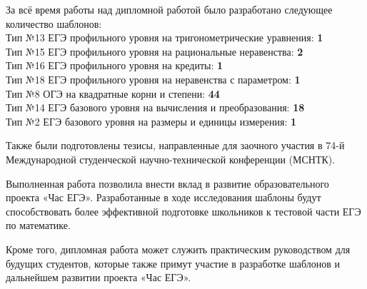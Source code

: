 За всё время работы над дипломной работой было разработано следующее количество шаблонов:
\\Тип №13 ЕГЭ профильного уровня  на тригонометрические уравнения: \textbf{1}
\\Тип №15 ЕГЭ профильного уровня на рациональные неравенства: \textbf{2}
\\Тип №16 ЕГЭ профильного уровня на кредиты: \textbf{1}
\\Тип №18 ЕГЭ профильного уровня на неравенства с параметром: \textbf{1}
\\Тип №8 ОГЭ на квадратные корни и степени: \textbf{44}
\\Тип №14 ЕГЭ базового уровня на вычисления и преобразования: \textbf{18}
\\Тип №2 ЕГЭ базового уровня на размеры и единицы измерения: \textbf{1}

Также были подготовлены тезисы, направленные для заочного участия в 74-й Международной студенческой научно-технической конференции (МСНТК).

Выполненная работа позволила внести вклад в развитие образовательного проекта «Час ЕГЭ». Разработанные в ходе исследования шаблоны будут способствовать более эффективной подготовке школьников к тестовой части ЕГЭ по математике.

Кроме того, дипломная работа может служить практическим руководством для будущих студентов, которые также примут участие в разработке шаблонов и дальнейшем развитии проекта «Час ЕГЭ».




